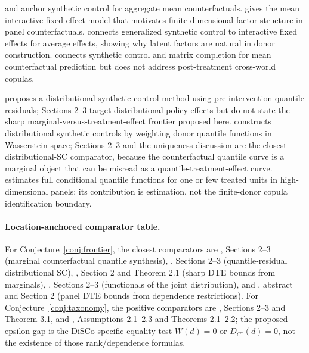 \documentclass[11pt]{article}
\theoremstyle{definition}
\theoremstyle{plain}
\theoremstyle{remark}
\begin{document}
\cite{AbadieGardeazabal2003} and \cite{AbadieDiamondHainmueller2010} anchor synthetic control for aggregate mean counterfactuals.  \cite{Bai2009IFE} gives the mean interactive-fixed-effect model that motivates finite-dimensional factor structure in panel counterfactuals.  \cite{Xu2017GSC} connects generalized synthetic control to interactive fixed effects for average effects, showing why latent factors are natural in donor construction.  \cite{AtheyBayatiDoudchenkoImbensKhosravi2021MC} connects synthetic control and matrix completion for mean counterfactual prediction but does not address post-treatment cross-world copulas.

\cite{Chen2020DistributionalSC} proposes a distributional synthetic-control method using pre-intervention quantile residuals; Sections 2--3 target distributional policy effects but do not state the sharp marginal-versus-treatment-effect frontier proposed here.  \cite{Gunsilius2023DiSCo} constructs distributional synthetic controls by weighting donor quantile functions in Wasserstein space; Sections 2--3 and the uniqueness discussion are the closest distributional-SC comparator, because the counterfactual quantile curve is a marginal object that can be misread as a quantile-treatment-effect curve.  \cite{Masini2025DCA} estimates full conditional quantile functions for one or few treated units in high-dimensional panels; its contribution is estimation, not the finite-donor copula identification boundary.

\paragraph{Location-anchored comparator table.}
For Conjecture~\ref{conj:frontier}, the closest comparators are \cite{Gunsilius2023DiSCo}, Sections 2--3 (marginal counterfactual quantile synthesis), \cite{Chen2020DistributionalSC}, Sections 2--3 (quantile-residual distributional SC), \cite{FanPark2010SharpBounds}, Section 2 and Theorem 2.1 (sharp DTE bounds from marginals), \cite{FirpoRidder2019Functionals}, Sections 2--3 (functionals of the joint distribution), and \cite{Callaway2021BoundsDTEPanel}, abstract and Section 2 (panel DTE bounds from dependence restrictions).  For Conjecture~\ref{conj:taxonomy}, the positive comparators are \cite{AtheyImbens2006CIC}, Sections 2--3 and Theorem 3.1, and \cite{CallawayLi2019QTEDID}, Assumptions 2.1--2.3 and Theorems 2.1--2.2; the proposed epsilon-gap is the DiSCo-specific equality test \(W(d)=0\) or \(D_{C^\star}(d)=0\), not the existence of those rank/dependence formulas.
\end{document}
